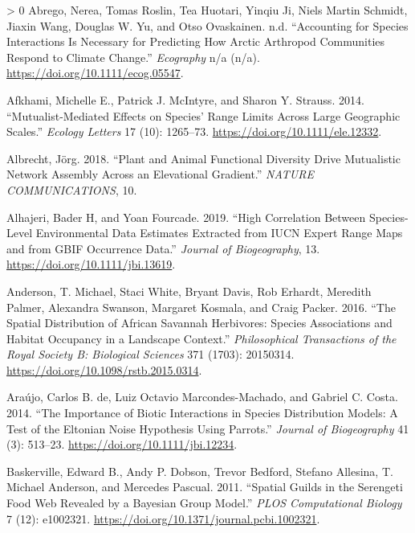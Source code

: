 \documentclass[11pt]{article}
\newlength{\cslhangindent}
\newenvironment{CSLReferences}[3] %
 {%
  \setlength{\parindent}{0pt}
  \ifodd #1 \everypar{\setlength{\hangindent}{\cslhangindent}}\ignorespaces\fi
  \ifnum #2 > 0
  \setlength{\parskip}{#2\baselineskip}
  \fi
 }%
 {}
\begin{document}
\hypertarget{refs}{}
\begin{CSLReferences}{1}{0}
\leavevmode\hypertarget{ref-AbregoAccSpe}{}%
Abrego, Nerea, Tomas Roslin, Tea Huotari, Yinqiu Ji, Niels Martin
Schmidt, Jiaxin Wang, Douglas W. Yu, and Otso Ovaskainen. n.d.
{``Accounting for Species Interactions Is Necessary for Predicting How
Arctic Arthropod Communities Respond to Climate Change.''}
\emph{Ecography} n/a (n/a). \url{https://doi.org/10.1111/ecog.05547}.

\leavevmode\hypertarget{ref-Afkhami2014MutEff}{}%
Afkhami, Michelle E., Patrick J. McIntyre, and Sharon Y. Strauss. 2014.
{``Mutualist-Mediated Effects on Species' Range Limits Across Large
Geographic Scales.''} \emph{Ecology Letters} 17 (10): 1265--73.
\url{https://doi.org/10.1111/ele.12332}.

\leavevmode\hypertarget{ref-Albrecht2018PlaAni}{}%
Albrecht, Jörg. 2018. {``Plant and Animal Functional Diversity Drive
Mutualistic Network Assembly Across an Elevational Gradient.''}
\emph{NATURE COMMUNICATIONS}, 10.

\leavevmode\hypertarget{ref-Alhajeri2019HigCor}{}%
Alhajeri, Bader H, and Yoan Fourcade. 2019. {``High Correlation Between
Species-Level Environmental Data Estimates Extracted from IUCN Expert
Range Maps and from GBIF Occurrence Data.''} \emph{Journal of
Biogeography}, 13. \url{https://doi.org/10.1111/jbi.13619}.

\leavevmode\hypertarget{ref-Anderson2016SpaDis}{}%
Anderson, T. Michael, Staci White, Bryant Davis, Rob Erhardt, Meredith
Palmer, Alexandra Swanson, Margaret Kosmala, and Craig Packer. 2016.
{``The Spatial Distribution of African Savannah Herbivores: Species
Associations and Habitat Occupancy in a Landscape Context.''}
\emph{Philosophical Transactions of the Royal Society B: Biological
Sciences} 371 (1703): 20150314.
\url{https://doi.org/10.1098/rstb.2015.0314}.

\leavevmode\hypertarget{ref-Araujo2014ImpBio}{}%
Araújo, Carlos B. de, Luiz Octavio Marcondes-Machado, and Gabriel C.
Costa. 2014. {``The Importance of Biotic Interactions in Species
Distribution Models: A Test of the Eltonian Noise Hypothesis Using
Parrots.''} \emph{Journal of Biogeography} 41 (3): 513--23.
\url{https://doi.org/10.1111/jbi.12234}.

\leavevmode\hypertarget{ref-Baskerville2011SpaGui}{}%
Baskerville, Edward B., Andy P. Dobson, Trevor Bedford, Stefano
Allesina, T. Michael Anderson, and Mercedes Pascual. 2011. {``Spatial
Guilds in the Serengeti Food Web Revealed by a Bayesian Group Model.''}
\emph{PLOS Computational Biology} 7 (12): e1002321.
\url{https://doi.org/10.1371/journal.pcbi.1002321}.


\end{CSLReferences}
\end{document}
